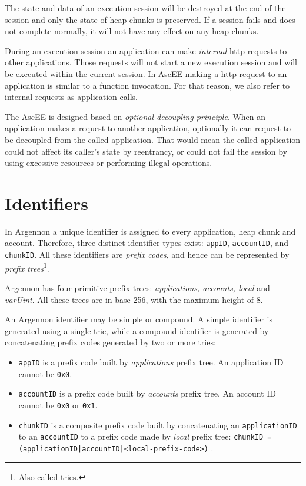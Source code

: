 The state and data of an execution session will be
destroyed at the end of the session and only the state of heap chunks is preserved. If a session fails and does not
complete normally, it will not have any effect on any heap chunks.

During an execution session an application can make \emph{internal} http requests to other applications. Those
requests will not start a new execution session and will be executed within the current session. In AscEE making a
http request to an application is similar to a function invocation. For that reason, we also refer to internal requests
as application calls.

The AscEE is designed based on \emph{optional decoupling principle}. When an application makes a request to another
application, optionally it can request to be decoupled from the called application. That would mean the called
application could not affect its caller's state by reentrancy, or could not fail the session by using excessive
resources or performing illegal operations.


\section{Identifiers}\label{sec:identifiers}

In Argennon a unique identifier is assigned to every application, heap chunk and account. Therefore, three distinct
identifier types exist: \texttt{appID}, \texttt{accountID}, and \texttt{chunkID}.
All these identifiers are \emph{prefix codes}, and hence can be represented by
\emph{prefix trees}\footnote{Also called tries.}.

Argennon has four primitive prefix trees:
\emph{applications, accounts, local} and \emph{varUint}.
All these trees are in base 256, with the maximum height
of 8.

An Argennon identifier may be simple or compound. A simple identifier is generated using a single trie, while a
compound identifier is generated by concatenating prefix codes generated by two or more tries:

\begin{itemize}
    \item \texttt{appID} is a prefix code built by \emph{applications} prefix tree. An application ID cannot
    be \texttt{0x0}.

    \item \texttt{accountID} is a prefix code built by \emph{accounts} prefix tree. An account ID cannot
    be \texttt{0x0} or \texttt{0x1}.

    \item \texttt{chunkID} is a composite prefix code built by concatenating an \texttt{applicationID} to
    an \texttt{accountID} to a prefix code made by \emph{local} prefix tree:
    \subitem \texttt{chunkID = (applicationID|accountID|<local-prefix-code>)} .
\end{itemize}

